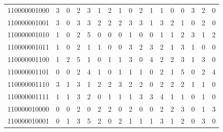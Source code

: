 \documentclass[10pt,a4paper]{article}
\begin{document}
\begin{longtable}{ |c|c|c|c|c|c|c|c|c|c|c|c|c|c|c|c|c| }
    110000001000              & 3                            & 0                                & 2                            & 3                              & 1   & 2   & 1   & 0   & 2   & 1   & 1   & 0   & 0   & 3   & 2   & 0   \\
    110000001001              & 3                            & 0                                & 3                            & 3                              & 2   & 2   & 2   & 3   & 3   & 1   & 3   & 2   & 1   & 0   & 2   & 0   \\
    110000001010              & 1                            & 0                                & 2                            & 5                              & 0   & 0   & 0   & 1   & 0   & 0   & 1   & 1   & 2   & 3   & 1   & 2   \\
    110000001011              & 1                            & 0                                & 2                            & 1                              & 1   & 0   & 0   & 3   & 2   & 3   & 2   & 1   & 3   & 1   & 0   & 0   \\
    110000001100              & 1                            & 2                                & 5                            & 1                              & 0   & 1   & 1   & 3   & 0   & 4   & 2   & 2   & 3   & 1   & 3   & 0   \\
    110000001101              & 0                            & 0                                & 2                            & 4                              & 1   & 0   & 1   & 1   & 1   & 0   & 2   & 1   & 5   & 0   & 2   & 4   \\
    110000001110              & 3                            & 1                                & 3                            & 1                              & 2   & 2   & 3   & 2   & 2   & 0   & 2   & 2   & 2   & 1   & 1   & 0   \\
    110000001111              & 1                            & 1                                & 3                            & 2                              & 0   & 1   & 1   & 1   & 3   & 3   & 4   & 1   & 1   & 0   & 1   & 0   \\
    110000010000              & 0                            & 0                                & 2                            & 0                              & 2   & 2   & 0   & 2   & 0   & 0   & 2   & 2   & 3   & 0   & 1   & 3   \\
    110000010001              & 0                            & 1                                & 3                            & 5                              & 2   & 0   & 2   & 1   & 1   & 1   & 3   & 1   & 2   & 0   & 3   & 0   \\

\end{longtable}
\end{document}
